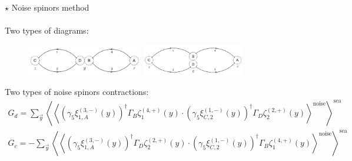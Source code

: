 \documentclass{beamer}
\begin{document}
\begin{frame}[noframenumbering]{$\star$ Noise spinors method}
      \framesubtitle{\hspace*{1pt}}
      Two types of diagrams:
      \begin{center}
            \begin{figure}
                  \includegraphics[width=0.45\textwidth]{../thesis-tex/imgs-MSc-thesis/Wick_stochastic_disc.png}
                  \includegraphics[width=0.4\textwidth]{../thesis-tex/imgs-MSc-thesis/Wick_stochastic_conn.png}
            \end{figure}
      \end{center}
      Two types of noise spinors contractions:
      \begin{equation*}
            \begin{gathered}
                  G_d =   \sum_{\vec y} \left\langle \left\langle \left(\gamma_5\xi^{(3,-)}_{1,A} (y) \right)^\dag \Gamma_B \zeta^{(4,+)}_1 (y) \cdot \left(\gamma_5\xi^{(1,-)}_{C,2} (y) \right)^\dag \Gamma_D \zeta^{(2,+)}_2 (y) \right\rangle^\text{noise} \right\rangle^{\text{sea}} \\
                  G_c = - \sum_{\vec y} \left\langle \left\langle \left(\gamma_5\xi^{(3,-)}_{1,A} (y) \right)^\dag \Gamma_D \zeta^{(2,+)}_2 (y) \cdot \left(\gamma_5\xi^{(1,-)}_{C,2} (y) \right)^\dag \Gamma_B \zeta^{(4,+)}_1 (y) \right\rangle^\text{noise} \right\rangle^{\text{sea}}
            \end{gathered}
      \end{equation*}
\end{frame}
\end{document}
